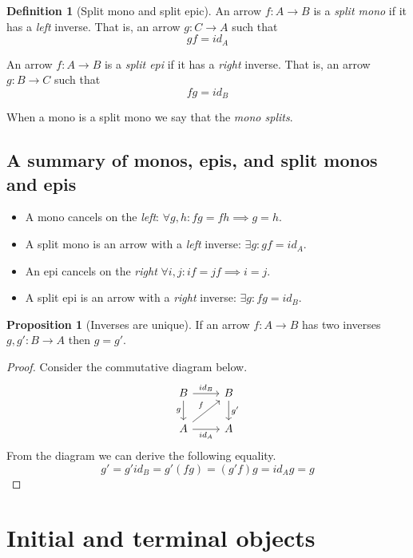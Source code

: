 \documentclass{book}
\theoremstyle{definition}
\newtheorem{definition}{Definition}[section]
\newtheorem{proposition}{Proposition}
\newcommand{\arr}[3]{#1 : #2 \rightarrow #3}
\newcommand\id{\mathit{id}}
\begin{document}
\begin{definition}[Split mono and split epic]
  An arrow $f : A \to B$ is a \emph{split mono} if it has a \emph{left}
  inverse. That is, an arrow $\arr{g}{C}{A}$ such that
  \[ gf = \id_A \]

  An arrow $\arr{f}{A}{B}$ is a \emph{split epi} if it has a \emph{right}
  inverse. That is, an arrow $\arr{g}{B}{C}$ such that
  \[ fg = \id_B \]
\end{definition}

When a mono is a split mono we say that the \emph{mono splits}.

\subsection{A summary of monos, epis, and split monos and epis}

\begin{itemize}
\item A mono cancels on the \emph{left}: $\forall g, h : fg = fh \implies g = h$.
\item A split mono is an arrow with a \emph{left} inverse: $\exists g : gf = \id_A$.
\item An epi cancels on the \emph{right} $\forall i, j : if = jf \implies i = j$.
\item A split epi is an arrow with a \emph{right} inverse: $\exists g : fg = \id_B$.
\end{itemize}

\begin{proposition}[Inverses are unique]
  If an arrow $\arr{f}{A}{B}$ has two inverses $\arr{g, g'}{B}{A}$ then $g =
  g'$.
\end{proposition}
\begin{proof}
  Consider the commutative diagram below.
  \[
    \begin{tikzcd}
      B \arrow[r, "id_B"] \arrow[d, "g"'] & B \arrow[d, "g'"] \\
      A \arrow[r, "id_A"'] \arrow[ru, "f"] & A
    \end{tikzcd}
  \]
  From the diagram we can derive the following equality.
  \[
    g' = g' \id_B = g' (f g) = (g' f) g = \id_A g = g
  \]
\end{proof}

\section{Initial and terminal objects}
\end{document}
